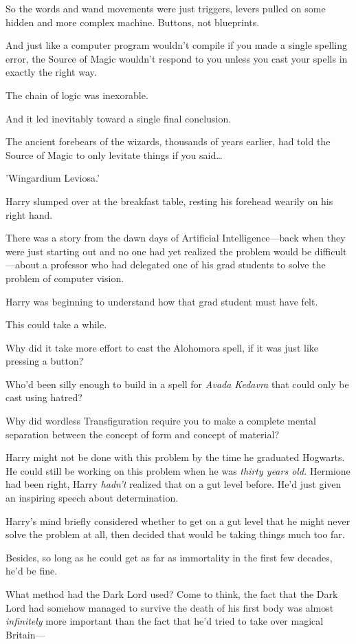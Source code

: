So the words and wand movements were just triggers, levers pulled on some 
hidden and more complex machine. Buttons, not blueprints.

And just like a computer program wouldn't compile if you made a single spelling 
error, the Source of Magic wouldn't respond to you unless you cast your spells 
in exactly the right way.

The chain of logic was inexorable.

And it led inevitably toward a single final conclusion.

The ancient forebears of the wizards, thousands of years earlier, had told the 
Source of Magic to only levitate things if you said{\ldots}

'Wingardium Leviosa.'

Harry slumped over at the breakfast table, resting his forehead wearily on his 
right hand.

There was a story from the dawn days of Artificial Intelligence---back when 
they were just starting out and no one had yet realized the problem would be 
difficult---about a professor who had delegated one of his grad students to 
solve the problem of computer vision.

Harry was beginning to understand how that grad student must have felt.

This could take a while.

Why did it take more effort to cast the Alohomora spell, if it was just like 
pressing a button?

Who'd been silly enough to build in a spell for \emph{Avada Kedavra} that could 
only be cast using hatred?

Why did wordless Transfiguration require you to make a complete mental 
separation between the concept of form and concept of material?

Harry might not be done with this problem by the time he graduated Hogwarts. He 
could still be working on this problem when he was \emph{thirty years old.} 
Hermione had been right, Harry \emph{hadn't} realized that on a gut level 
before. He'd just given an inspiring speech about determination.

Harry's mind briefly considered whether to get on a gut level that he might 
never solve the problem at all, then decided that would be taking things much 
too far.

Besides, so long as he could get as far as immortality in the first few 
decades, he'd be fine.

What method had the Dark Lord used? Come to think, the fact that the Dark Lord 
had somehow managed to survive the death of his first body was almost 
\emph{infinitely} more important than the fact that he'd tried to take over 
magical Britain---

